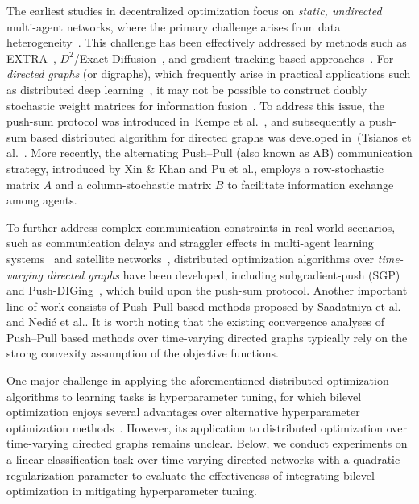 \documentclass{article}
\theoremstyle{plain}
\theoremstyle{definition}
\theoremstyle{remark}
\begin{document}
The earliest studies in decentralized optimization focus on \textit{static, undirected} multi-agent networks, where the primary challenge arises from data heterogeneity~\cite{KoloskovaDH2020}. 
This challenge has been effectively addressed by methods such as EXTRA~\cite{Shi2015extra}, $D^{2}$/Exact-Diffusion~\cite{YanD22018,YuanED2023}, and gradient-tracking based approaches~\cite{KoloskovaGT2021,PuSGT2021}. For \textit{directed graphs} (or digraphs), which frequently arise in practical applications such as distributed deep learning~\cite{AssranSGP2019}, it may not be possible to construct doubly stochastic weight matrices for information fusion~\cite{GharesifardTopo2010}. To address this issue, the push-sum protocol was introduced in~Kempe et al.~, and subsequently a push-sum based distributed algorithm for directed graphs was developed in~(Tsianos et al.~. 
More recently, the alternating Push–Pull (also known as AB) communication strategy, introduced by Xin \& Khan  and Pu et al., employs a row-stochastic matrix $A$ and a column-stochastic matrix $B$ to facilitate information exchange among agents.

To further address complex communication constraints in real-world scenarios, such as communication delays and straggler effects in multi-agent learning systems~\cite{WeiUAV2005,dasMARL2019,GaydamakaUAV2024} and satellite networks~\cite{KaushalSatellite2017,HanSatellite2023}, distributed optimization algorithms over \textit{time-varying directed graphs} have been developed,  including subgradient-push (SGP)~\cite{Nedic2015tvpushgd} and Push-DIGing~\cite{nedicdiging2017}, which build upon the push-sum protocol. 
Another important line of work consists of Push–Pull based methods proposed by Saadatniya et al. and Nedić et al..  
It is worth noting that the existing convergence analyses of Push–Pull based methods over time-varying directed graphs typically rely on the strong convexity assumption of the objective functions. 

One major challenge in applying the aforementioned distributed optimization algorithms to learning tasks is hyperparameter tuning, for which bilevel optimization enjoys several advantages over alternative hyperparameter optimization methods~\cite{FranceschiHPO2018,mackay2019self}. However, its application to distributed optimization over time-varying directed graphs remains unclear. 
Below, we conduct experiments on a linear classification task over time-varying directed networks with a quadratic regularization parameter to evaluate the effectiveness of integrating bilevel optimization in mitigating hyperparameter tuning. 
\end{document}
